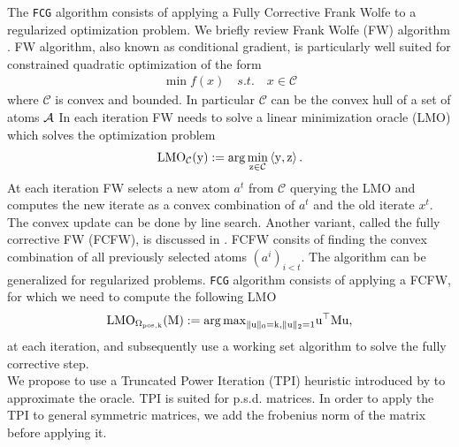 \documentclass[letterpaper]{article}
\begin{document}
The \texttt{FCG} algorithm consists of applying a Fully Corrective Frank Wolfe \citep{LacosteFCFW} to a regularized optimization problem. We briefly review Frank Wolfe (FW) algorithm \citep{frank1956algorithm}. FW algorithm, also known as conditional gradient, is particularly well suited for constrained quadratic optimization of the form
\begin{align*}
\min f(x) \quad s.t. \quad x\in \mathcal{C}
\end{align*}
where $\mathcal{C}$ is convex and bounded. In particular $\mathcal{C}$ can be the convex hull of a set of atoms $\mathcal{A}$  In each iteration FW needs to solve a linear minimization oracle (LMO) which solves the optimization problem
\begin{align}
\rm{{LMO}}_{\mathcal{C}}(y) := \arg\min_{z \in \mathcal{C}} \left\langle y,z \right\rangle.
\end{align}
At each iteration FW selects a new atom $a^t$ from $\mathcal{C}$ querying the LMO and computes the new iterate as a convex combination of $a^t$ and the old iterate $x^t$. The convex update can be done by line search. Another variant, called the fully corrective FW (FCFW), is discussed in \citet{LacosteFCFW}. FCFW consits of finding the convex combination of all previously selected atoms $(a^i)_{i<t}$. The algorithm can be generalized for regularized problems. \texttt{FCG} algorithm consists of applying a FCFW, for which we need to compute the following LMO 
\begin{align}
\rm{{LMO}}_{\Omega_{pos,k}}(M) :={\arg\max}_{\|u\|_0=k, \|u\|_ 2=1 } u^{\top}Mu,
\end{align}
at each iteration, and subsequently use a working set algorithm to solve the fully corrective step.\\

We propose to use a Truncated Power Iteration (TPI) heuristic introduced by \citet{yuan2013truncated} to approximate the oracle. TPI is suited for p.s.d. matrices. In order to apply the TPI to general symmetric matrices, we add the frobenius norm of the matrix before applying it. \\

\end{document}
